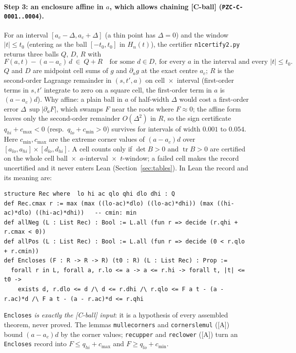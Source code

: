 \documentclass[10pt]{article}
\newcommand{\tier}[1]{\textsf{[#1]}}
\newcommand{\tA}{\tier{A}}
\newcommand{\tCb}{\textcolor{blue!60!black}{\textsf{[C-ball]}}}
\newcommand{\lean}[1]{\texttt{#1}}
\renewcommand{\_}{\textunderscore\penalty0\hspace{0pt}}
\newcommand{\tr}{\operatorname{tr}}
\begin{document}
\paragraph{Step 3: an enclosure affine in $a$, which allows chaining \tCb{} (\texttt{PZC-C-0001..0004}).}
For an interval $[a_c-\Delta,a_c+\Delta]$ (a thin point has $\Delta=0$) and the window $|t|\le t_0$ (entering as the ball $[-t_0,t_0]$ in $H_n(t)$), the certifier \texttt{n1\_certify2.py} returns three balls $Q$, $D$, $R$ with
\[F(a,t)-(a-a_c)\,d\ \in\ Q+R\quad\text{for some }d\in D,\ \text{for every }a\text{ in the interval and every }|t|\le t_0 .\]
$Q$ and $D$ are midpoint cell sums of $g$ and $\partial_ag$ at the exact centre $a_c$; $R$ is the second-order Lagrange remainder in $(s,t',a)$ on cell~$\times$~interval (first-order terms in $s,t'$ integrate to zero on a square cell, the first-order term in $a$ is $(a-a_c)d$).
Why affine: a plain ball in $a$ of half-width $\Delta$ would cost a first-order error $\Delta\,\sup|\partial_aF|$, which swamps $F$ near the roots where $F\approx0$; the affine form leaves only the second-order remainder $O(\Delta^2)$ in $R$, so the sign certificate $q_{hi}+c_{\max}<0$ (resp.\ $q_{lo}+c_{\min}>0$) survives for intervals of width $0.001$ to $0.054$. Here $c_{\min},c_{\max}$ are the extreme corner values of $(a-a_c)d$ over $[a_{lo},a_{hi}]\times[d_{lo},d_{hi}]$.
A cell counts only if $\det B>0$ and $\tr B>0$ are certified on the whole cell ball~$\times$~$a$-interval~$\times$~$t$-window; a failed cell makes the record uncertified and it never enters Lean (Section~\ref{sec:tables}). In Lean the record and its meaning are:
\begin{lstlisting}
structure Rec where  lo hi ac qlo qhi dlo dhi : Q
def Rec.cmax r := max (max ((lo-ac)*dlo) ((lo-ac)*dhi)) (max ((hi-ac)*dlo) ((hi-ac)*dhi))   -- cmin: min
def allNeg (L : List Rec) : Bool := L.all (fun r => decide (r.qhi + r.cmax < 0))
def allPos (L : List Rec) : Bool := L.all (fun r => decide (0 < r.qlo + r.cmin))
def Encloses (F : R -> R -> R) (t0 : R) (L : List Rec) : Prop :=
  forall r in L, forall a, r.lo <= a -> a <= r.hi -> forall t, |t| <= t0 ->
    exists d, r.dlo <= d /\ d <= r.dhi /\ r.qlo <= F a t - (a - r.ac)*d /\ F a t - (a - r.ac)*d <= r.qhi
\end{lstlisting}
\lean{Encloses} \emph{is exactly the \tCb{} input}: it is a hypothesis of every assembled theorem, never proved. The lemmas \lean{mul\_le\_corners} and \lean{corners\_le\_mul} (\tA) bound $(a-a_c)d$ by the corner values; \lean{rec\_upper} and \lean{rec\_lower} (\tA) turn an \lean{Encloses} record into $F\le q_{hi}+c_{\max}$ and $F\ge q_{lo}+c_{\min}$.
\end{document}
